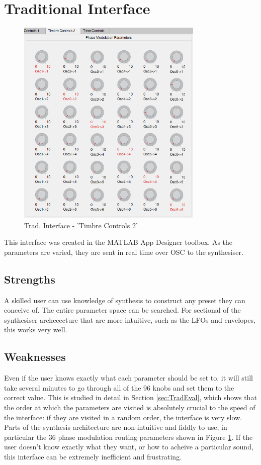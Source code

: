 \documentclass[11pt, oneside]{report}   	%
\begin{document}
\section{Traditional Interface}
\begin{figure}
		\vspace{-10pt}
	\includegraphics[width = 3.5in]{TraditionalUI2.png}
	\caption{Trad. Interface - 'Timbre Controls 2'}
	\label{fig:TraditionalInterface2}
	\vspace{-60pt}
\end{figure}
This interface was created in the MATLAB App Designer toolbox. As the parameters are varied, they are sent in real time over OSC to the synthesiser.
\subsection{Strengths}
A skilled user can use knowledge of synthesis to construct any preset they can conceive of. The entire parameter space can be searched. For sectional of the synthesiser archececture that are more intuitive, such as the LFOs and envelopes, this works very well.
\subsection{Weaknesses}
Even if the user knows exactly what each parameter should be set to, it will still take several minutes to go through all of the 96 knobs and set them to the correct value. This is studied in detail in Section \ref{sec:TradEval}, which shows that the order at which the parameters are visited is absolutely crucial to the speed of the interface: if they are visited in a random order, the interface is very slow. Parts of the synthesis architecture are non-intuitive and fiddly to use, in particular the 36 phase modulation routing parameters shown in Figure \ref{fig:TraditionalInterface2}. If the user doesn't know exactly what they want, or how to acheive a particular sound, this interface can be extremely inefficient and frustrating.
\pagebreak
\end{document}
